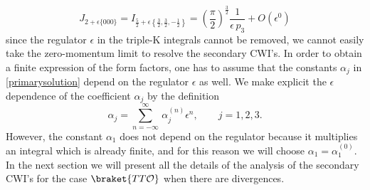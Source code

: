\documentclass[a4paper,11pt,openright,twoside]{book}
\newcommand{\mO}{\mathcal{O}}
\let\a=\alpha   \let\b=\beta   \let\g=\gamma   \let\d=\delta
\let\e=\epsilon \let\z=\zeta   \let\h=\eta     \let\q=\theta
\numberwithin{equation}{section}
\begin{document}
{{{{	\begin{equation}
		J_{2+\e\{000\}}=I_{\frac{5}{2}+\e\left\{\frac{3}{2},\frac{3}{2},-\frac{1}{2}\right\}}=\left(\frac{\pi}{2}\right)^{\frac{3}{2}}\frac{1}{\e\,p_3}+O(\e^0)
	\end{equation}
	since the regulator $\e$ in the triple-K integrals cannot be removed, we cannot easily take the zero-momentum limit to resolve the secondary CWI's. In order to obtain a finite expression of the form factors, one has to assume that the constants $\a_j$ in \eqref{primarysolution} depend on the regulator $\e$ as well. We make explicit the $\e$ dependence of the coefficient $\a_j$ by the definition
	\begin{equation}
		\a_j=\sum_{n=-\infty}^{\infty}\,\a_j^{(n)}\e^n,\qquad j=1,2,3\label{expans}.
	\end{equation}
	However, the constant $\a_1$ does not depend on the regulator because it multiplies an integral which is already finite, and for this reason we will choose $\a_1=\a^{(0)}_1$. In the next section we will present all the details of the analysis of the secondary CWI's for the case $\braket{TT\mO}$ when there are divergences. 
}

}}}
\end{document}
